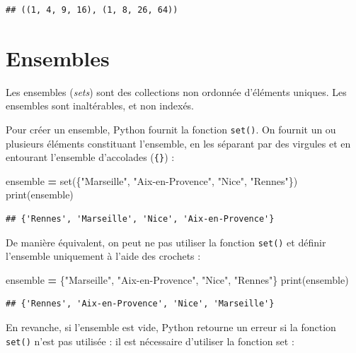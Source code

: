 \documentclass[
  12pt,
]{book}
\newenvironment{Shaded}{\begin{snugshade}}{\end{snugshade}}
\newcommand{\BuiltInTok}[1]{#1}
\newcommand{\NormalTok}[1]{#1}
\newcommand{\OperatorTok}[1]{\textcolor[rgb]{0.81,0.36,0.00}{\textbf{#1}}}
\newcommand{\StringTok}[1]{\textcolor[rgb]{0.31,0.60,0.02}{#1}}
\numberwithin{equation}{section}
\numberwithin{countremarque}{section}
\begin{document}
\begin{lstlisting}
## ((1, 4, 9, 16), (1, 8, 26, 64))
\end{lstlisting}

\section{Ensembles}\label{structure-ensembles}

Les ensembles (\emph{sets}) sont des collections non ordonnée d'éléments uniques. Les ensembles sont inaltérables, et non indexés.

Pour créer un ensemble, Python fournit la fonction \texttt{set()}. On fournit un ou plusieurs éléments constituant l'ensemble, en les séparant par des virgules et en entourant l'ensemble d'accolades (\texttt{\{\}}) :

\begin{Shaded}
\begin{Highlighting}[]
\NormalTok{ensemble }\OperatorTok{=} \BuiltInTok{set}\NormalTok{(\{}\StringTok{"Marseille"}\NormalTok{, }\StringTok{"Aix{-}en{-}Provence"}\NormalTok{, }\StringTok{"Nice"}\NormalTok{, }\StringTok{"Rennes"}\NormalTok{\})}
\BuiltInTok{print}\NormalTok{(ensemble)}
\end{Highlighting}
\end{Shaded}

\begin{lstlisting}
## {'Rennes', 'Marseille', 'Nice', 'Aix-en-Provence'}
\end{lstlisting}

De manière équivalent, on peut ne pas utiliser la fonction \texttt{set()} et définir l'ensemble uniquement à l'aide des crochets :

\begin{Shaded}
\begin{Highlighting}[]
\NormalTok{ensemble }\OperatorTok{=}\NormalTok{ \{}\StringTok{"Marseille"}\NormalTok{, }\StringTok{"Aix{-}en{-}Provence"}\NormalTok{, }\StringTok{"Nice"}\NormalTok{, }\StringTok{"Rennes"}\NormalTok{\}}
\BuiltInTok{print}\NormalTok{(ensemble)}
\end{Highlighting}
\end{Shaded}

\begin{lstlisting}
## {'Rennes', 'Aix-en-Provence', 'Nice', 'Marseille'}
\end{lstlisting}

En revanche, si l'ensemble est vide, Python retourne un erreur si la fonction \texttt{set()} n'est pas utilisée :
il est nécessaire d'utiliser la fonction set :
\end{document}
